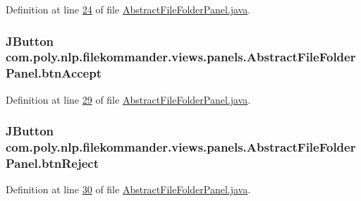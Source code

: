 Definition at line \hyperlink{L24}{24} of file \hyperlink{}{Abstract\-File\-Folder\-Panel.\-java}.

\hypertarget{classcom_1_1poly_1_1nlp_1_1filekommander_1_1views_1_1panels_1_1_abstract_file_folder_panel_a723f421b878bd4d7207a614376b03315}{
\subsubsection[{btn\-Accept}]{\setlength{\rightskip}{0pt plus 5cm}J\-Button com.\-poly.\-nlp.\-filekommander.\-views.\-panels.\-Abstract\-File\-Folder\-Panel.\-btn\-Accept\hspace{0.3cm}{\ttfamily [private]}}}\label{classcom_1_1poly_1_1nlp_1_1filekommander_1_1views_1_1panels_1_1_abstract_file_folder_panel_a723f421b878bd4d7207a614376b03315}


Definition at line \hyperlink{L29}{29} of file \hyperlink{}{Abstract\-File\-Folder\-Panel.\-java}.

\hypertarget{classcom_1_1poly_1_1nlp_1_1filekommander_1_1views_1_1panels_1_1_abstract_file_folder_panel_a3ae502ea80c38e1160cf63f3944638b2}{
\subsubsection[{btn\-Reject}]{\setlength{\rightskip}{0pt plus 5cm}J\-Button com.\-poly.\-nlp.\-filekommander.\-views.\-panels.\-Abstract\-File\-Folder\-Panel.\-btn\-Reject\hspace{0.3cm}{\ttfamily [private]}}}\label{classcom_1_1poly_1_1nlp_1_1filekommander_1_1views_1_1panels_1_1_abstract_file_folder_panel_a3ae502ea80c38e1160cf63f3944638b2}


Definition at line \hyperlink{L30}{30} of file \hyperlink{}{Abstract\-File\-Folder\-Panel.\-java}.

